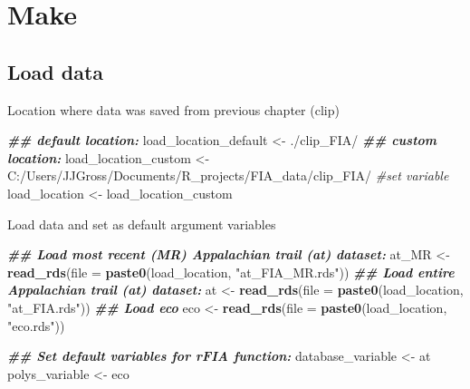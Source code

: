 \documentclass[
]{book}
\newenvironment{Shaded}{\begin{snugshade}}{\end{snugshade}}
\newcommand{\AttributeTok}[1]{\textcolor[rgb]{0.13,0.29,0.53}{#1}}
\newcommand{\CommentTok}[1]{\textcolor[rgb]{0.56,0.35,0.01}{\textit{#1}}}
\newcommand{\DocumentationTok}[1]{\textcolor[rgb]{0.56,0.35,0.01}{\textbf{\textit{#1}}}}
\newcommand{\FunctionTok}[1]{\textcolor[rgb]{0.13,0.29,0.53}{\textbf{#1}}}
\newcommand{\NormalTok}[1]{#1}
\newcommand{\OtherTok}[1]{\textcolor[rgb]{0.56,0.35,0.01}{#1}}
\newcommand{\StringTok}[1]{\textcolor[rgb]{0.31,0.60,0.02}{#1}}
\begin{document}
\hypertarget{make}{%
\chapter{Make}\label{make}}

\hypertarget{load-data}{%
\section{Load data}\label{load-data}}

Location where data was saved from previous chapter (clip)

\begin{Shaded}
\begin{Highlighting}[]
\DocumentationTok{\#\# default location:}
\NormalTok{load\_location\_default }\OtherTok{\textless{}{-}} \StringTok{\textquotesingle{}./clip\_FIA/\textquotesingle{}}
\DocumentationTok{\#\# custom location:}
\NormalTok{load\_location\_custom }\OtherTok{\textless{}{-}} \StringTok{\textquotesingle{}C:/Users/JJGross/Documents/R\_projects/FIA\_data/clip\_FIA/\textquotesingle{}} 
\CommentTok{\#set variable}
\NormalTok{load\_location }\OtherTok{\textless{}{-}}\NormalTok{ load\_location\_custom}
\end{Highlighting}
\end{Shaded}

Load data and set as default argument variables

\begin{Shaded}
\begin{Highlighting}[]
\DocumentationTok{\#\# Load most recent (MR) Appalachian trail (at) dataset:}
\NormalTok{at\_MR }\OtherTok{\textless{}{-}} \FunctionTok{read\_rds}\NormalTok{(}\AttributeTok{file =} \FunctionTok{paste0}\NormalTok{(load\_location, }\StringTok{"at\_FIA\_MR.rds"}\NormalTok{))}
\DocumentationTok{\#\# Load entire Appalachian trail (at) dataset:}
\NormalTok{at }\OtherTok{\textless{}{-}} \FunctionTok{read\_rds}\NormalTok{(}\AttributeTok{file =} \FunctionTok{paste0}\NormalTok{(load\_location, }\StringTok{"at\_FIA.rds"}\NormalTok{)) }
\DocumentationTok{\#\# Load eco}
\NormalTok{eco }\OtherTok{\textless{}{-}} \FunctionTok{read\_rds}\NormalTok{(}\AttributeTok{file =} \FunctionTok{paste0}\NormalTok{(load\_location, }\StringTok{"eco.rds"}\NormalTok{)) }

\DocumentationTok{\#\# Set default variables for rFIA function:}
\NormalTok{database\_variable }\OtherTok{\textless{}{-}}\NormalTok{ at}
\NormalTok{polys\_variable }\OtherTok{\textless{}{-}}\NormalTok{ eco}
\end{Highlighting}
\end{Shaded}
\end{document}
